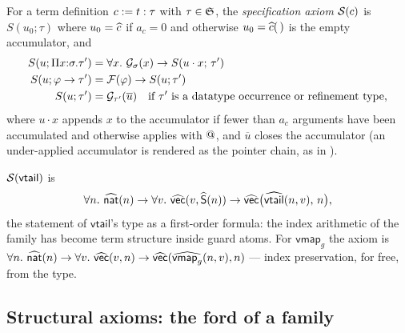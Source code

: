 \begin{definition}
\label{def:spec}
For a term definition $c \mathrel{:=} t : \tau$ with $\tau \in \mathfrak{S}$, the
\emph{specification axiom} $\mathcal{S}(c)$ is $S(u_0; \tau)$ where $u_0 =
\widehat{c}$ if $a_c = 0$ and otherwise $u_0 = \widehat{c}(\,)$ is the empty
accumulator, and
\begin{align*}
  S(u; \Pi x{:}\sigma.\tau') &= \forall x.\ \mathcal{G}_{\sigma}(x) \to
    S(u \cdot x;\, \tau')\\
  S(u; \varphi \to \tau') &= \mathcal{F}(\varphi) \to S(u; \tau')\\
  S(u; \tau') &= \mathcal{G}_{\tau'}(\overline{u}) \quad
    \text{if $\tau'$ is a datatype occurrence or refinement type,}
\end{align*}
where $u \cdot x$ appends $x$ to the accumulator if fewer than $a_c$
arguments have been accumulated and otherwise applies with $\mathbin{@}$, and
$\overline{u}$ closes the accumulator (an under-applied accumulator is
rendered as the pointer chain, as in \cite{Extraction2026}).
\end{definition}

\begin{example}
\label{ex:spec-vtail}
$\mathcal{S}(\mathsf{vtail})$ is
\[
  \forall n.\ \widehat{\mathsf{nat}}(n) \to \forall v.\
  \widehat{\mathsf{vec}}(v, \widehat{\mathsf{S}}(n)) \to
  \widehat{\mathsf{vec}}\bigl(\widehat{\mathsf{vtail}}(n,v),\, n\bigr),
\]
the statement of $\mathsf{vtail}$'s type as a first-order formula: the
index arithmetic of the family has become term structure inside guard
atoms.  For $\mathsf{vmap}_g$ the axiom is $\forall n.\ \widehat{\mathsf{nat}}(n)
\to \forall v.\ \widehat{\mathsf{vec}}(v,n) \to
\widehat{\mathsf{vec}}(\widehat{\mathsf{vmap}_g}(n,v), n)$ --- index preservation,
for free, from the type.
\end{example}

\subsection{Structural axioms: the ford of a family}
\label{sec:translation-structural}

